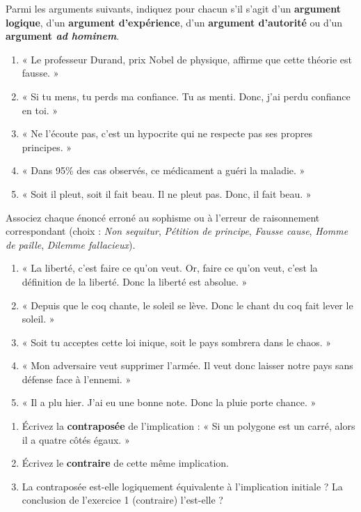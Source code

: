 \documentclass[11pt]{article}
\begin{document}
\begin{exercice}
Parmi les arguments suivants, indiquez pour chacun s'il s'agit d'un \textbf{argument logique}, d'un \textbf{argument d'expérience}, d'un \textbf{argument d'autorité} ou d'un \textbf{argument \textit{ad hominem}}.
\begin{enumerate}
    \item « Le professeur Durand, prix Nobel de physique, affirme que cette théorie est fausse. »
    \item « Si tu mens, tu perds ma confiance. Tu as menti. Donc, j'ai perdu confiance en toi. »
    \item « Ne l'écoute pas, c'est un hypocrite qui ne respecte pas ses propres principes. »
    \item « Dans 95\% des cas observés, ce médicament a guéri la maladie. »
    \item « Soit il pleut, soit il fait beau. Il ne pleut pas. Donc, il fait beau. »
\end{enumerate}
\end{exercice}

\begin{exercice}
Associez chaque énoncé erroné au sophisme ou à l'erreur de raisonnement correspondant (choix : \textit{Non sequitur}, \textit{Pétition de principe}, \textit{Fausse cause}, \textit{Homme de paille}, \textit{Dilemme fallacieux}).
\begin{enumerate}
    \item « La liberté, c'est faire ce qu'on veut. Or, faire ce qu'on veut, c'est la définition de la liberté. Donc la liberté est absolue. »
    \item « Depuis que le coq chante, le soleil se lève. Donc le chant du coq fait lever le soleil. »
    \item « Soit tu acceptes cette loi inique, soit le pays sombrera dans le chaos. »
    \item « Mon adversaire veut supprimer l'armée. Il veut donc laisser notre pays sans défense face à l'ennemi. »
    \item « Il a plu hier. J'ai eu une bonne note. Donc la pluie porte chance. »
\end{enumerate}
\end{exercice}

\begin{exercice}
\begin{enumerate}
    \item Écrivez la \textbf{contraposée} de l'implication : « Si un polygone est un carré, alors il a quatre côtés égaux. »
    \item Écrivez le \textbf{contraire} de cette même implication.
    \item La contraposée est-elle logiquement équivalente à l'implication initiale ? La conclusion de l'exercice 1 (contraire) l'est-elle ?
\end{enumerate}
\end{exercice}
\end{document}
